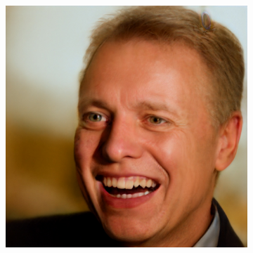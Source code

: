 \begin{figure}[h!]
\begin{subfigure}[b]{0.24\textwidth}
    \end{subfigure}
    \begin{subfigure}[b]{0.24\textwidth}
        \includegraphics[width=\textwidth]{fig/stylegan/faceedit/uffe-smile}
    \end{subfigure}
    

\end{figure}
